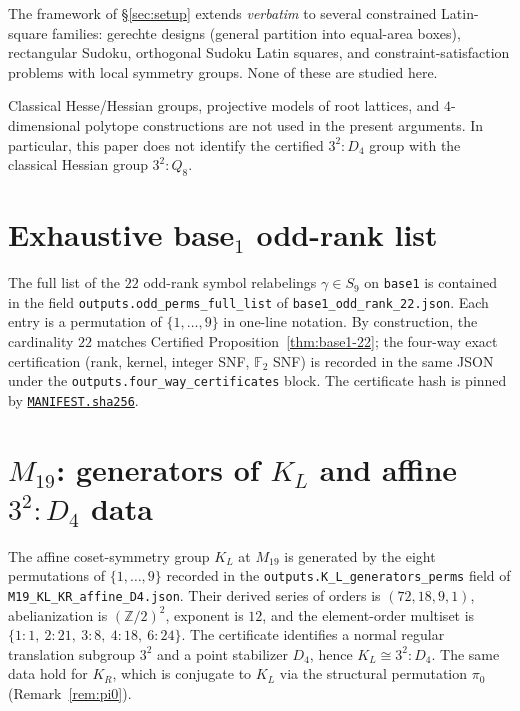 \documentclass[11pt,a4paper]{article}
\theoremstyle{definition}
\theoremstyle{remark}
\providecommand{\Z}{\mathbb{Z}}
\newcommand{\KL}{K_L}
\newcommand{\KR}{K_R}
\begin{document}
The framework of \S\ref{sec:setup} extends \emph{verbatim} to several
constrained Latin-square families: gerechte designs (general
partition into equal-area boxes), rectangular Sudoku, orthogonal
Sudoku Latin squares, and constraint-satisfaction problems with
local symmetry groups. None of these are studied here.

Classical Hesse/Hessian groups, projective models of root lattices,
and $4$-dimensional polytope constructions are not used in the present
arguments. In particular, this paper does not identify the certified
$3^2{:}D_4$ group with the classical Hessian group $3^2{:}Q_8$.

\appendix

\section{\texorpdfstring{Exhaustive base$_1$ odd-rank list}{Exhaustive base1 odd-rank list}}\label{app:22-perms}

The full list of the $22$ odd-rank symbol relabelings $\gamma \in
S_9$ on \texttt{base1} is contained in the field
\texttt{outputs.odd\_perms\_full\_list} of
\texttt{base1\_odd\_rank\_22.json}. Each entry is a permutation of
$\{1,\dots,9\}$ in one-line notation. By construction, the cardinality
$22$ matches Certified Proposition~\ref{thm:base1-22}; the four-way exact
certification (rank, kernel, integer SNF, $\mathbb{F}_2$ SNF) is
recorded in the same JSON under the
\texttt{outputs.four\_way\_certificates} block. The certificate hash
is pinned by
\href{../certified/MANIFEST.sha256}{\texttt{MANIFEST.sha256}}.

\section{\texorpdfstring{$M_{19}$: generators of $\KL$ and affine $3^2{:}D_4$ data}{M19: generators of KL and affine 3 squared colon D4 data}}
\label{app:M19-generators}

The affine coset-symmetry group $\KL$ at $M_{19}$ is generated by the eight
permutations of $\{1, \dots, 9\}$ recorded in the
\texttt{outputs.K\_L\_generators\_perms} field of
\texttt{M19\_KL\_KR\_affine\_D4.json}. Their derived series of orders
is $(72, 18, 9, 1)$, abelianization is $(\Z/2)^2$, exponent is $12$, and
the element-order multiset is $\{1\!:\!1,\ 2\!:\!21,\ 3\!:\!8,\
4\!:\!18,\ 6\!:\!24\}$. The certificate identifies a normal regular
translation subgroup $3^2$ and a point stabilizer $D_4$, hence
$\KL \cong 3^2{:}D_4$. The same data hold for $\KR$,
which is conjugate to $\KL$ via the structural permutation $\pi_0$
(Remark~\ref{rem:pi0}).
\end{document}

